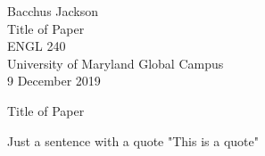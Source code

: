 \documentclass[12pt]{report}
\def \paperauthor {Bacchus Jackson}
\def \papertitle {Title of Paper}
\def \paperclass {ENGL 240}
\def \paperschool {University of Maryland Global Campus}
\def \paperdate {9 December 2019}
\begin{document}
\fancyhead[L]{}

\begin{flushleft}
    \paperauthor\\
    \papertitle\\
    \paperclass\\
    \paperschool\\
    \paperdate

\end{flushleft}

\begin{center}
    \papertitle
\end{center}

Just a sentence with a quote "This is a quote" \autocite{thomas}

\lipsum[4]

\printbibliography
\end{document}
